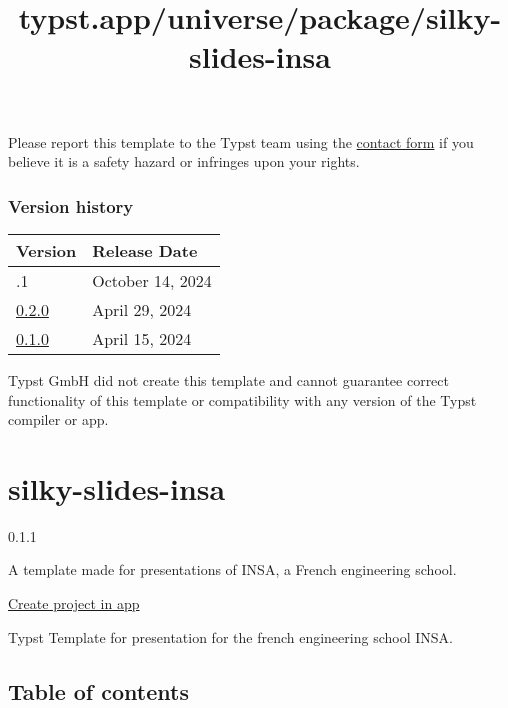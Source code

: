 Please report this template to the Typst team using the
\href{https://typst.app/contact}{contact form} if you believe it is a
safety hazard or infringes upon your rights.

\label{versions}
\subsubsection{Version history}\label{version-history}

\begin{longtable}[]{@{}ll@{}}
\toprule\noalign{}
Version & Release Date \\
\midrule\noalign{}
\endhead
\bottomrule\noalign{}
\endlastfoot
0.2.1 & October 14, 2024 \\
\href{https://typst.app/universe/package/minerva-report-fcfm/0.2.0/}{0.2.0}
& April 29, 2024 \\
\href{https://typst.app/universe/package/minerva-report-fcfm/0.1.0/}{0.1.0}
& April 15, 2024 \\
\end{longtable}

Typst GmbH did not create this template and cannot guarantee correct
functionality of this template or compatibility with any version of the
Typst compiler or app.


\title{typst.app/universe/package/silky-slides-insa}

\label{banner}
\label{template-thumbnail}

\section{silky-slides-insa}\label{silky-slides-insa}

{ 0.1.1 }

A template made for presentations of INSA, a French engineering school.

\href{/app?template=silky-slides-insa&version=0.1.1}{Create project in
app}

\label{readme}

Typst Template for presentation for the french engineering school INSA.

\subsection{Table of contents}\label{table-of-contents}


